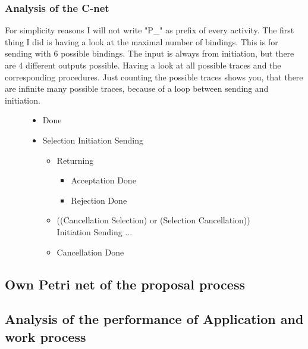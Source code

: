 \subsubsection{Analysis of the C-net}
For simplicity reasons I will not write "P\_" as prefix of every activity.
The first thing I did is having a look at the maximal number of bindings. This is for sending with 6 possible bindings. The input is always from initiation, but there are 4 different outputs possible. Having a look at all possible traces and the corresponding procedures.  Just counting the possible traces shows you, that there are infinite many possible traces, because of a loop between sending and initiation. 
\begin{figure}[!htbp]
\begin{itemize}
	\item Done
	\item Selection \textrightarrow Initiation \textrightarrow Sending \textrightarrow
	\begin{itemize}
	\item  Returning \textrightarrow
	\begin{itemize}
		\item Acceptation \textrightarrow Done
		\item Rejection \textrightarrow Done
	\end{itemize}
	\item ((Cancellation \textrightarrow Selection) or (Selection \textrightarrow Cancellation)) \textrightarrow Initiation \textrightarrow Sending ...
	\item Cancellation \textrightarrow Done
	\end{itemize}
\end{itemize}
\end{figure}


\subsection{Own Petri net of the proposal process}

\subsection{Analysis of the performance of Application and work process}

